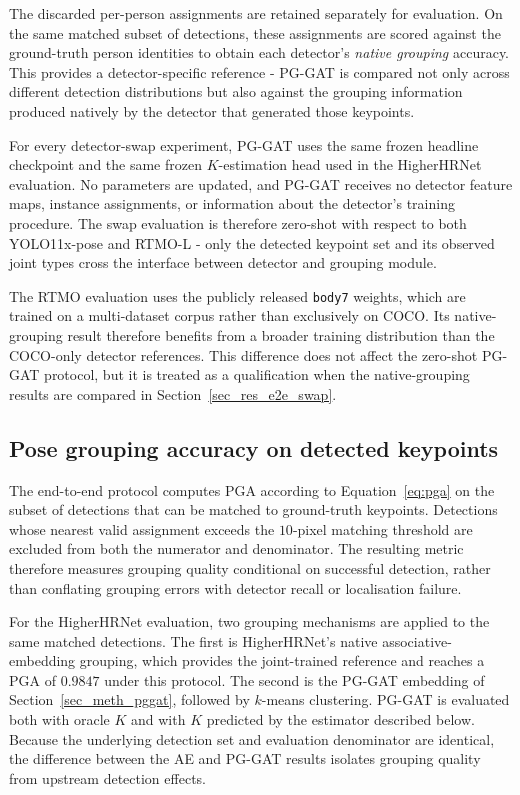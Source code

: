 The discarded per-person assignments are retained separately
for evaluation.
On the same matched subset of detections,
these assignments are scored against the ground-truth person identities
to obtain each detector's \emph{native grouping} accuracy.
This provides a detector-specific reference -
PG-GAT is compared not only across different detection distributions
but also against the grouping information produced natively
by the detector that generated those keypoints.

For every detector-swap experiment,
PG-GAT uses the same frozen headline checkpoint
and the same frozen $K$-estimation head used in the HigherHRNet evaluation.
No parameters are updated,
and PG-GAT receives no detector feature maps,
instance assignments,
or information about the detector's training procedure.
The swap evaluation is therefore zero-shot with respect to both
YOLO11x-pose and RTMO-L -
only the detected keypoint set and its observed joint types
cross the interface between detector and grouping module.

The RTMO evaluation uses the publicly released \texttt{body7} weights,
which are trained on a multi-dataset corpus
rather than exclusively on COCO.
Its native-grouping result therefore benefits from a broader training
distribution than the COCO-only detector references.
This difference does not affect the zero-shot PG-GAT protocol,
but it is treated as a qualification when the native-grouping results
are compared in Section~\ref{sec_res_e2e_swap}.

\subsection{Pose grouping accuracy on detected keypoints}
\label{sec_meth_integration_e2e_metric}

The end-to-end protocol computes PGA according to
Equation~\eqref{eq:pga} on the subset of detections that can be matched
to ground-truth keypoints.
Detections whose nearest valid assignment exceeds the $10$-pixel
matching threshold are excluded from both the numerator and denominator.
The resulting metric therefore measures grouping quality conditional
on successful detection,
rather than conflating grouping errors with detector recall
or localisation failure.

For the HigherHRNet evaluation,
two grouping mechanisms are applied to the same matched detections.
The first is HigherHRNet's native associative-embedding grouping,
which provides the joint-trained reference and reaches a PGA of $0.9847$
under this protocol.
The second is the PG-GAT embedding of Section~\ref{sec_meth_pggat},
followed by $k$-means clustering.
PG-GAT is evaluated both with oracle $K$ and with $K$ predicted
by the estimator described below.
Because the underlying detection set and evaluation denominator
are identical,
the difference between the AE and PG-GAT results isolates grouping quality
from upstream detection effects.

